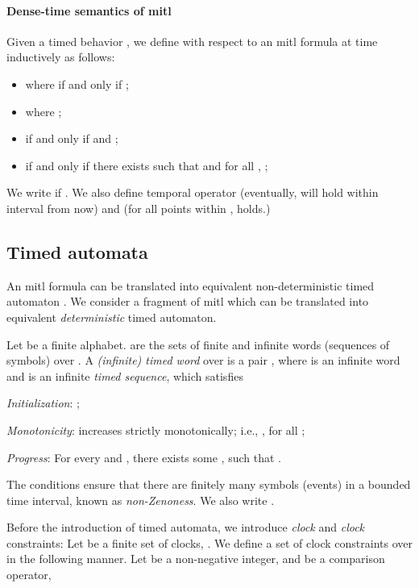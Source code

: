 \documentclass[letterpaper, 10 pt, conference]{ieeeconf}
\begin{document}
\paragraph*{Dense-time semantics of \ac{mitl}} Given a timed behavior
, we define  with respect to an \ac{mitl}
formula  at time  inductively as follows:
\begin{itemize}
\item  where  if and only if ;
\item  where ;
\item  if and only if  and ;
\item  if and only if there
  exists  such that  and for all
  , ;
\end{itemize}
We write  if . We also define
temporal operator 
(eventually,  will hold within interval  from now) and
 (for all
points within ,  holds.)


\subsection{Timed automata}
An \ac{mitl} formula can be translated into equivalent
non-deterministic timed automaton \cite{Alur1996}. We consider a
fragment of \ac{mitl} which can be translated into equivalent
\emph{deterministic} timed automaton.




Let  be a finite alphabet.  are
the sets of finite and infinite words (sequences of symbols) over
. A \emph{(infinite) timed word} \cite{Alur1994183} over
 is a pair , where
 is an infinite word
and  is an infinite \emph{timed sequence},
which satisfies \begin{inparaenum}[1)]
\item \emph{Initialization}: ;
\item \emph{Monotonicity}:  increases strictly monotonically;
  i.e., , for all ;
\item \emph{Progress}: For every  and
  , there exists some , such that
  .
\end{inparaenum}
The conditions ensure that there are finitely many symbols (events) in
a bounded time interval, known as \emph{non-Zenoness}.  We also write
.








Before the introduction of timed automata, we introduce \emph{clock}
and \emph{clock} constraints: Let  be a finite set of clocks,
. We define a set  of clock
constraints over  in the following manner. Let  be a
non-negative integer, and  be
a comparison operator,
\end{document}
